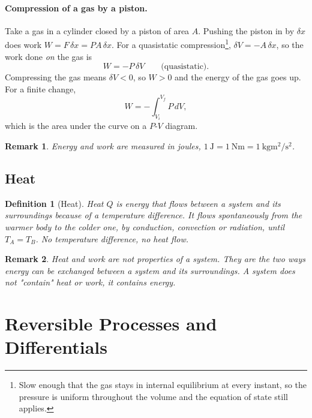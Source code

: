 \documentclass{article}
\newtheorem{definition}{Definition}
\newtheorem{remark}{Remark}
\begin{document}
\paragraph{Compression of a gas by a piston.}
Take a gas in a cylinder closed by a piston of area $A$. Pushing the piston in by $\delta x$ does work $W = F\,\delta x = PA\,\delta x$. For a quasistatic compression\footnote{Slow enough that the gas stays in internal equilibrium at every instant, so the pressure is uniform throughout the volume and the equation of state still applies.}, $\delta V = -A \, \delta x$, so the work done \textit{on} the gas is
\[W = -P \, \delta V \qquad \text{(quasistatic)}.\]
Compressing the gas means $\delta V < 0$, so $W > 0$ and the energy of the gas goes up. For a finite change,
\begin{equation}
    \label{eq:work}
    W = -\int_{V_i}^{V_f} P \, dV,
\end{equation}
which is the area under the curve on a $P$-$V$ diagram.

\begin{remark}
    Energy and work are measured in joules, $\SI{1}{\joule} = \SI{1}{\newton\metre} = \SI{1}{\kilo\gram\metre\squared\per\second\squared}$.
\end{remark}

\subsection{Heat}
\begin{definition}[Heat]
    Heat $Q$ is energy that flows between a system and its surroundings because of a temperature difference. It flows spontaneously from the warmer body to the colder one, by conduction, convection or radiation, until $T_A = T_B$. No temperature difference, no heat flow.
\end{definition}

\begin{remark}
    Heat and work are not properties of a system. They are the two ways energy can be exchanged between a system and its surroundings. A system does not "contain" heat or work, it contains energy.
\end{remark}

\section{Reversible Processes and Differentials}
\end{document}
